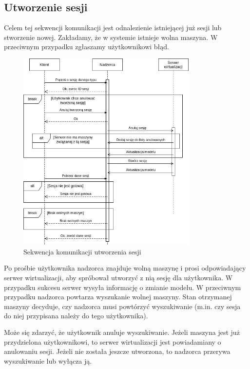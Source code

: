 \documentclass[../opis-rozwiazania.tex]{subfiles}
\begin{document}
\label{communication-sec}

\subsection{Utworzenie sesji}

Celem tej sekwencji komunikacji jest odnalezienie istniejącej już sesji lub stworzenie nowej.
Zakładamy, że w systemie istnieje wolna maszyna.
W przeciwnym przypadku zgłaszamy użytkownikowi błąd.

\begin{figure}[H]
  \centering
  \includegraphics[width=0.8\textwidth]{../diagrams/sequence_diagrams/tworzenie_sesji.png}
  \caption{Sekwencja komunikacji utworzenia sesji}
  \label{figure:diagrams:sequence_diagrams:tworzenie_sesji}
\end{figure}

Po prośbie użytkownika nadzorca znajduje wolną maszynę i prosi odpowiadający serwer wirtualizacji, aby spróbował utworzyć z nią sesję dla użytkownika.
W przypadku sukcesu serwer wysyła informację o zmianie modelu.
W przeciwnym przypadku nadzorca powtarza wyszukanie wolnej maszyny.
Stan otrzymanej maszyny decyduje, czy nadzorca musi powtórzyć wyszukiwanie (m.in. czy sesja do niej przypisana należy do tego użytkownika).

Może się zdarzyć, że użytkownik anuluje wyszukiwanie.
Jeżeli maszyna jest już przydzielona użytkownikowi, to serwer wirtualizacji jest powiadamiany o anulowaniu sesji.
Jeżeli nie została jeszcze utworzona, to nadzorca przerywa wyszukiwanie lub wyłącza ją.
\end{document}
